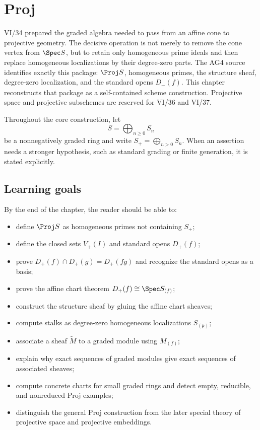 \chapter{Proj}
\label{ch:vi35-proj}

VI/34 prepared the graded algebra needed to pass from an affine cone to projective geometry.  The decisive operation is not merely to remove the cone vertex from \(\Spec S\), but to retain only homogeneous prime ideals and then replace homogeneous localizations by their degree-zero parts.  The AG4 source identifies exactly this package: \(\Proj S\), homogeneous primes, the structure sheaf, degree-zero localization, and the standard opens \(D_+(f)\).  This chapter reconstructs that package as a self-contained scheme construction.  Projective space and projective subschemes are reserved for VI/36 and VI/37.

Throughout the core construction, let
\[
S=\bigoplus_{n\ge 0}S_n
\]
be a nonnegatively graded ring and write \(S_+=\bigoplus_{n>0}S_n\).  When an assertion needs a stronger hypothesis, such as standard grading or finite generation, it is stated explicitly.

\section*{Learning goals}
By the end of the chapter, the reader should be able to:
\begin{itemize}
\item define \(\Proj S\) as homogeneous primes not containing \(S_+\);
\item define the closed sets \(V_+(I)\) and standard opens \(D_+(f)\);
\item prove \(D_+(f)\cap D_+(g)=D_+(fg)\) and recognize the standard opens as a basis;
\item prove the affine chart theorem \(D_+(f)\cong\Spec S_{(f)}\);
\item construct the structure sheaf by gluing the affine chart sheaves;
\item compute stalks as degree-zero homogeneous localizations \(S_{(\mathfrak p)}\);
\item associate a sheaf \(\widetilde M\) to a graded module using \(M_{(f)}\);
\item explain why exact sequences of graded modules give exact sequences of associated sheaves;
\item compute concrete charts for small graded rings and detect empty, reducible, and nonreduced Proj examples;
\item distinguish the general Proj construction from the later special theory of projective space and projective embeddings.
\end{itemize}

